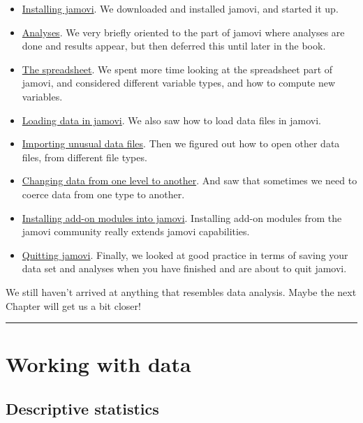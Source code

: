 \documentclass[
]{book}
\providecommand{\tightlist}{%
  \setlength{\itemsep}{0pt}\setlength{\parskip}{0pt}}
\begin{document}
\begin{itemize}
\tightlist
\item
  \protect\hyperlink{installing-jamovi}{Installing jamovi}. We downloaded and installed jamovi, and started it up.
\item
  \protect\hyperlink{analyses}{Analyses}. We very briefly oriented to the part of jamovi where analyses are done and results appear, but then deferred this until later in the book.
\item
  \protect\hyperlink{the-spreadsheet}{The spreadsheet}. We spent more time looking at the spreadsheet part of jamovi, and considered different variable types, and how to compute new variables.
\item
  \protect\hyperlink{loading-data-in-jamovi}{Loading data in jamovi}. We also saw how to load data files in jamovi.
\item
  \protect\hyperlink{importing-unusual-data-files}{Importing unusual data files}. Then we figured out how to open other data files, from different file types.
\item
  \protect\hyperlink{changing-data-from-one-level-to-another}{Changing data from one level to another}. And saw that sometimes we need to coerce data from one type to another.
\item
  \protect\hyperlink{installing-add-on-modules-into-jamovi}{Installing add-on modules into jamovi}. Installing add-on modules from the jamovi community really extends jamovi capabilities.
\item
  \protect\hyperlink{quitting-jamovi}{Quitting jamovi}. Finally, we looked at good practice in terms of saving your data set and analyses when you have finished and are about to quit jamovi.
\end{itemize}

We still haven't arrived at anything that resembles data analysis. Maybe the next Chapter will get us a bit closer!

\begin{center}\rule{0.5\linewidth}{0.5pt}\end{center}

\hypertarget{part-working-with-data}{%
\part{Working with data}\label{part-working-with-data}}

\hypertarget{descriptive-statistics}{%
\chapter{Descriptive statistics}\label{descriptive-statistics}}
\end{document}
